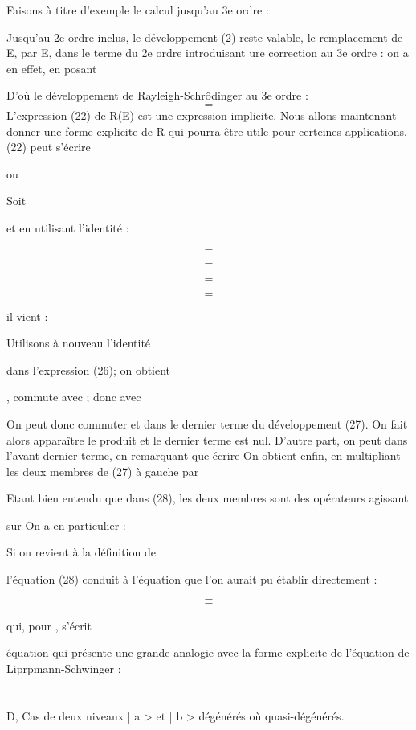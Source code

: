 Faisons à titre d'exemple le calcul jusqu'au 3e ordre :

Jusqu'au 2e ordre inclus, le développement (2) reste valable, le
remplacement de E, par E, dans le terme du 2e ordre introduisant ure correction au 3e ordre : on a en effet, en posant

D'où le développement de Rayleigh-Schrôdinger au 3e ordre :
\[
\tag{25}=
\]
L'expression (22) de R(E) est une expression implicite. Nous allons maintenant
donner une forme explicite de R qui pourra être utile pour certeines applications. (22) peut s'écrire

ou

Soit

et en utilisant l'identité :


\[
\tag{26}=
\]

\[
\tag{27}=
\]


\[
\tag{28}=
\]


\[
\tag{29}=
\]


il vient :

Utilisons à nouveau l'identité

dans l'expression (26); on obtient

, commute avec ; donc avec 

On peut donc commuter  et  dans le dernier terme du
développement (27). On fait alors apparaître le produit  et le dernier terme est nul.
D'autre part, on peut dans l'avant-dernier terme, en remarquant que  écrire
On obtient enfin, en multipliant les deux membres de (27) à gauche par

Etant bien entendu que dans (28), les deux membres sont des opérateurs agissant

sur 
On a en particulier :

Si on revient à la définition de

l'équation (28) conduit à l'équation que l'on aurait pu établir directement :


\[
\tag{30}=
\]
\[
\tag{31}=
\]

qui, pour , s'écrit

équation qui présente une grande analogie avec la forme explicite de
l'équation de Liprpmann-Schwinger :

 
\section{}
D, Cas de deux niveaux | a > et | b > dégénérés où quasi-dégénérés.

